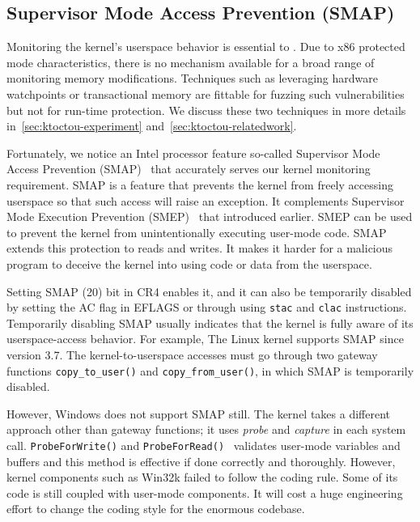 \subsection{Supervisor Mode Access Prevention (SMAP)}

Monitoring the kernel's userspace behavior is essential to \name. Due to x86 protected mode characteristics, there is no mechanism available for a broad range of monitoring memory modifications. Techniques such as leveraging hardware watchpoints or transactional memory are fittable for fuzzing such vulnerabilities but not for run-time protection. We discuss these two techniques in more details in~\autoref{sec:ktoctou-experiment} and~\autoref{sec:ktoctou-relatedwork}.

Fortunately, we notice an Intel processor feature so-called Supervisor Mode Access Prevention (SMAP)~\cite{corbet2012supervisorsmap} that accurately serves our kernel monitoring requirement.
SMAP is a feature that prevents the kernel from freely accessing userspace so that such access will raise an exception. It complements Supervisor Mode Execution Prevention (SMEP)~\cite{fischer2011supervisor} that introduced earlier. SMEP can be used to prevent the kernel from unintentionally executing user-mode code. SMAP extends this protection to reads and writes. It makes it harder for a malicious program to deceive the kernel into using code or data from the userspace.

Setting SMAP (20) bit in CR4 enables it, and it can also be temporarily disabled by setting the AC flag in EFLAGS or through using \texttt{stac} and \texttt{clac} instructions. Temporarily disabling SMAP usually indicates that the kernel is fully aware of its userspace-access behavior. For example, The Linux kernel supports SMAP since version 3.7. The kernel-to-userspace accesses must go through two gateway functions \texttt{copy\_to\_user()} and \texttt{copy\_from\_user()}, in which SMAP is temporarily disabled.

However, Windows does not support SMAP still. The kernel takes a different approach other than gateway functions; it uses \textit{probe} and \textit{capture} in each system call. \texttt{ProbeForWrite()}  and \texttt{ProbeForRead()}~\cite{probeforread} validates user-mode variables and buffers and this method is effective if done correctly and thoroughly. However, kernel components such as Win32k failed to follow the coding rule.  Some of its code is still coupled with user-mode components. It will cost a huge engineering effort to change the coding style for the enormous codebase.



